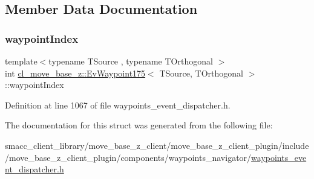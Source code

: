 \subsection{Member Data Documentation}
\mbox{\label{structcl__move__base__z_1_1EvWaypoint175_a576c5ba9ca97dc1f7dbd88ea95f1221c}} 
\subsubsection{\texorpdfstring{waypoint\+Index}{waypointIndex}}
{\footnotesize\ttfamily template$<$typename T\+Source , typename T\+Orthogonal $>$ \\
int \hyperlink{structcl__move__base__z_1_1EvWaypoint175}{cl\+\_\+move\+\_\+base\+\_\+z\+::\+Ev\+Waypoint175}$<$ T\+Source, T\+Orthogonal $>$\+::waypoint\+Index}



Definition at line 1067 of file waypoints\+\_\+event\+\_\+dispatcher.\+h.



The documentation for this struct was generated from the following file\+:\begin{DoxyCompactItemize}
\item 
smacc\+\_\+client\+\_\+library/move\+\_\+base\+\_\+z\+\_\+client/move\+\_\+base\+\_\+z\+\_\+client\+\_\+plugin/include/move\+\_\+base\+\_\+z\+\_\+client\+\_\+plugin/components/waypoints\+\_\+navigator/\hyperlink{waypoints__event__dispatcher_8h}{waypoints\+\_\+event\+\_\+dispatcher.\+h}\end{DoxyCompactItemize}
